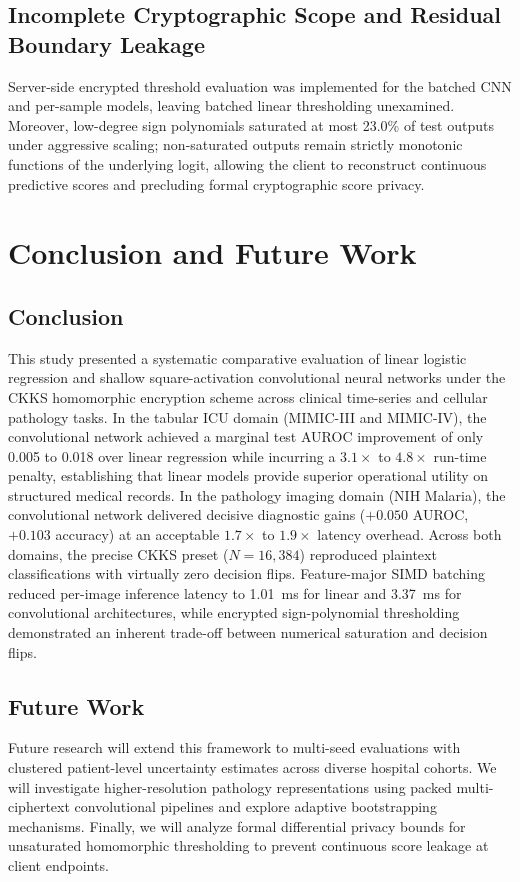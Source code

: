 \documentclass[conference]{IEEEtran}
\begin{document}
\subsection{Incomplete Cryptographic Scope and Residual Boundary Leakage}
Server-side encrypted threshold evaluation was implemented for the batched CNN and per-sample models, leaving batched linear thresholding unexamined. Moreover, low-degree sign polynomials saturated at most 23.0\% of test outputs under aggressive scaling; non-saturated outputs remain strictly monotonic functions of the underlying logit, allowing the client to reconstruct continuous predictive scores and precluding formal cryptographic score privacy.

\section{Conclusion and Future Work}\label{sec:conclusion}

\subsection{Conclusion}
This study presented a systematic comparative evaluation of linear logistic regression and shallow square-activation convolutional neural networks under the CKKS homomorphic encryption scheme across clinical time-series and cellular pathology tasks. In the tabular ICU domain (MIMIC-III and MIMIC-IV), the convolutional network achieved a marginal test AUROC improvement of only 0.005 to 0.018 over linear regression while incurring a $3.1\times$ to $4.8\times$ run-time penalty, establishing that linear models provide superior operational utility on structured medical records. In the pathology imaging domain (NIH Malaria), the convolutional network delivered decisive diagnostic gains ($+0.050$ AUROC, $+0.103$ accuracy) at an acceptable $1.7\times$ to $1.9\times$ latency overhead. Across both domains, the precise CKKS preset ($N = 16{,}384$) reproduced plaintext classifications with virtually zero decision flips. Feature-major SIMD batching reduced per-image inference latency to 1.01~ms for linear and 3.37~ms for convolutional architectures, while encrypted sign-polynomial thresholding demonstrated an inherent trade-off between numerical saturation and decision flips.

\subsection{Future Work}
Future research will extend this framework to multi-seed evaluations with clustered patient-level uncertainty estimates across diverse hospital cohorts. We will investigate higher-resolution pathology representations using packed multi-ciphertext convolutional pipelines and explore adaptive bootstrapping mechanisms. Finally, we will analyze formal differential privacy bounds for unsaturated homomorphic thresholding to prevent continuous score leakage at client endpoints.
\end{document}
